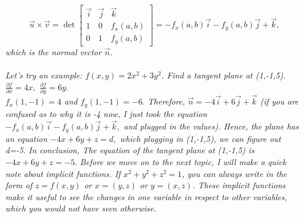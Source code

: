 \documentclass[addpoints]{exam}
\begin{document}
\textit{
\[\vec{u}\times\vec{v}=\det\begin{bmatrix}
    \vec{i}&\vec{j}&\vec{k}\\
    1&0&f_x(a,b)\\
    0&1&f_y(a,b)
\end{bmatrix}=-f_x(a,b)\vec{i}-f_y(a,b)\vec{j}+\vec{k},\]
which is the normal vector $\vec{n}.$
}\\\\
\textit{
Let's try an example: $f(x,y)=2x^2+3y^2$. Find a tangent plane at (1,-1,5). $\frac{\partial f}{\partial x}=4x,$ $ \frac{\partial f}{\partial y}=6y.$ \\$f_x(1,-1)=4$ and $f_y(1,-1)=-6.$ Therefore, $\vec{n}=-4\vec{i}+6\vec{j}+\vec{k}$ (if you are confused as to why it is -4 now, I just took the equation $-f_x(a,b)\vec{i}-f_y(a,b)\vec{j}+\vec{k},$ and plugged in the values). Hence, the plane has an equation $-4x+6y+z=d,$ which plugging in (1,-1,5), we can figure out d=-5. In conclusion, The equation of the tangent plane at (1,-1,5) is $-4x+6y+z=-5.$
}
\textit{
Before we move on to the next topic, I will make a quick note about implicit functions. If $x^2+y^2+z^2=1$, you can always write in the form of $z=f(x,y)$ or $x=(y,z)$ or $y=(x,z)$. These implicit functions make it useful to see the changes in one variable in respect to other variables, which you would not have seen otherwise.
}
\end{document}
